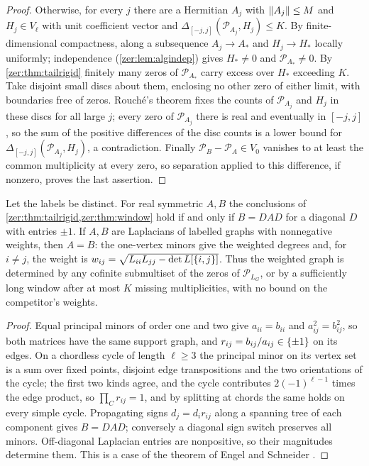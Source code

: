 \begin{proof}
Otherwise, for every $j$ there are a Hermitian $A_j$ with $\lVert A_j\rVert\le M$ and $H_j\in V_\ell$ with unit
coefficient vector and $\Delta_{[-j,j]}(\mathcal P_{A_j},H_j)\le K$. By finite-dimensional compactness, along a
subsequence $A_j\to A_*$ and $H_j\to H_*$ locally uniformly; independence (\cref{zer:lem:algindep}) gives
$H_*\ne0$ and $\mathcal P_{A_*}\ne0$. By \cref{zer:thm:tailrigid} finitely many zeros of $\mathcal P_{A_*}$
carry excess over $H_*$ exceeding $K$. Take disjoint small discs about them, enclosing no other zero of
either limit, with boundaries free of zeros. Rouch\'e's theorem fixes the counts of $\mathcal P_{A_j}$ and
$H_j$ in these discs for all large $j$; every zero of $\mathcal P_{A_j}$ there is real and eventually in
$[-j,j]$, so the sum of the positive differences of the disc counts is a lower bound for
$\Delta_{[-j,j]}(\mathcal P_{A_j},H_j)$, a contradiction. Finally $\mathcal P_B-\mathcal P_A\in V_0$ vanishes to
at least the common multiplicity at every zero, so separation applied to this difference, if nonzero,
proves the last assertion.
\end{proof}

\begin{corollary}\label{zer:cor:graphrecover}
Let the labels be distinct. For real symmetric $A,B$ the conclusions of
\cref{zer:thm:tailrigid,zer:thm:window} hold if and only if $B=DAD$ for a diagonal $D$ with entries
$\pm1$. If $A,B$ are Laplacians of labelled graphs with nonnegative weights, then $A=B$: the one-vertex
minors give the weighted degrees and, for $i\ne j$, the weight is
$w_{ij}=\sqrt{L_{ii}L_{jj}-\det L[\{i,j\}]}$. Thus the weighted graph is determined by any cofinite
submultiset of the zeros of $\mathcal P_{L_G}$, or by a sufficiently long window after at most $K$ missing
multiplicities, with no bound on the competitor's weights.
\end{corollary}

\begin{proof}
Equal principal minors of order one and two give $a_{ii}=b_{ii}$ and $a_{ij}^2=b_{ij}^2$, so both
matrices have the same support graph, and $r_{ij}=b_{ij}/a_{ij}\in\{\pm1\}$ on its edges. On a chordless
cycle of length $\ell\ge3$ the principal minor on its vertex set is a sum over fixed points, disjoint edge
transpositions and the two orientations of the cycle; the first two kinds agree, and the cycle
contributes $2(-1)^{\ell-1}$ times the edge product, so $\prod_Cr_{ij}=1$, and by splitting at chords the
same holds on every simple cycle. Propagating signs $d_j=d_ir_{ij}$ along a spanning tree of each component
gives $B=DAD$; conversely a diagonal sign switch preserves all minors. Off-diagonal Laplacian entries are
nonpositive, so their magnitudes determine them. This is a case of the theorem of Engel and Schneider
\cite{EngelSchneider1980Matrices}.
\end{proof}


